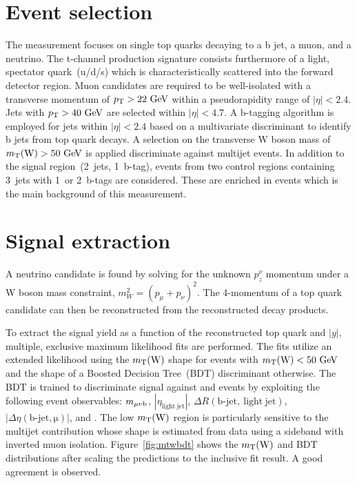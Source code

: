 \documentclass[12pt]{article}
\begin{document}
\section{Event selection}

The measurement focuses on single top quarks decaying to a b jet, a muon, and a neutrino. The t-channel production signature consists furthermore of a light, spectator quark~(u/d/s) which is characteristically scattered into the forward detector region. Muon candidates are required to be well-isolated with a transverse momentum of $p_\mathrm{T}>22~\mathrm{GeV}$ within a pseudorapidity range of $|\eta|<2.4$. Jets with $p_\mathrm{T}>40~\mathrm{GeV}$ are selected within $|\eta|<4.7$. A b-tagging algorithm is employed for jets within $|\eta|<2.4$ based on a multivariate discriminant to identify b jets from top quark decays. A selection on the transverse W boson mass of $m_{\mathrm{T}}(\mathrm{W})>50~\mathrm{GeV}$ is applied discriminate against multijet events. In addition to the signal region~(2~jets, 1~b-tag), events from two control regions containing 3~jets with 1~or 2~b-tags are considered. These are enriched in \ttbar events which is the main background of this measurement.


\section{Signal extraction}

A neutrino candidate is found by solving for the unknown $p_{z}^{\nu}$ momentum under a W boson mass constraint, $m_{W}^{2}=(p_{\mu}+p_{\nu})^{2}$. The 4-momentum of a top quark candidate can then be reconstructed from the reconstructed decay products.

To extract the signal yield as a function of the reconstructed top quark \pt and $|y|$, multiple, exclusive maximum likelihood fits are performed. The fits utilize an extended likelihood using the $m_{\mathrm{T}}(\mathrm{W})$ shape for events with $m_{\mathrm{T}}(\mathrm{W})<50~\mathrm{GeV}$ and the shape of a Boosted Decision Tree~(BDT) discriminant otherwise. The BDT is trained to discriminate signal against \ttbar and \wjets events by exploiting the following event observables: $m_{\mu\nu \mathrm{b}}$, $|\eta_\mathrm{light~jet}|$, $\Delta R(\mathrm{b\mbox{-}jet,~light~jet})$, $|\Delta\eta(\mathrm{b\mbox{-}jet,\mu})|$, and \mtw. The low $m_{\mathrm{T}}(\mathrm{W})$ region is particularly sensitive to the multijet contribution whose shape is estimated from data using a sideband with inverted muon isolation. Figure~\ref{fig:mtwbdt} shows the $m_{\mathrm{T}}(\mathrm{W})$ and BDT distributions after scaling the predictions to the inclusive fit result. A good agreement is observed.
\end{document}
